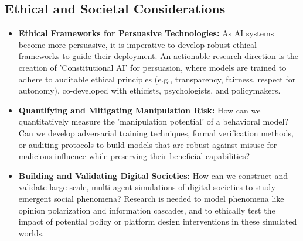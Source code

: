 \subsection*{Ethical and Societal Considerations}
\begin{itemize}
    \item \textbf{Ethical Frameworks for Persuasive Technologies:} As AI systems become more persuasive, it is imperative to develop robust ethical frameworks to guide their deployment. An actionable research direction is the creation of 'Constitutional AI' for persuasion, where models are trained to adhere to auditable ethical principles (e.g., transparency, fairness, respect for autonomy), co-developed with ethicists, psychologists, and policymakers.

    \item \textbf{Quantifying and Mitigating Manipulation Risk:} How can we quantitatively measure the 'manipulation potential' of a behavioral model? Can we develop adversarial training techniques, formal verification methods, or auditing protocols to build models that are robust against misuse for malicious influence while preserving their beneficial capabilities?

    \item \textbf{Building and Validating Digital Societies:} How can we construct and validate large-scale, multi-agent simulations of digital societies to study emergent social phenomena? Research is needed to model phenomena like opinion polarization and information cascades, and to ethically test the impact of potential policy or platform design interventions in these simulated worlds.
\end{itemize}

